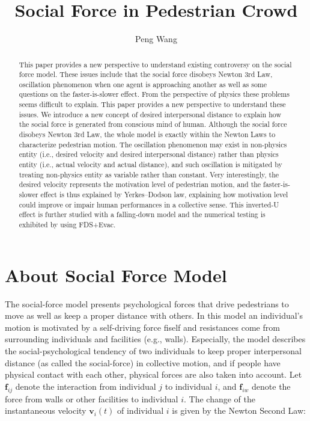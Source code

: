 \documentclass{article}
\begin{document}
\title{Social Force in Pedestrian Crowd}
\author{Peng Wang}%


\maketitle

\begin{abstract}
This paper provides a new perspective to understand existing controversy on the social force model.  These issues include that the social force disobeys Newton 3rd Law, oscillation phenomenon when one agent is approaching another as well as some questions on the faster-is-slower effect.  From the perspective of physics these problems seems difficult to explain.  This paper provides a new perspective to understand these issues.  We introduce a new concept of desired interpersonal distance to explain how the social force is generated from conscious mind of human.  Although the social force disobeys Newton 3rd Law, the whole model is exactly within the Newton Laws to characterize pedestrian motion.  The oscillation phenomenon may exist in non-physics entity (i.e., desired velocity and desired interpersonal distance) rather than physics entity (i.e., actual velocity and actual distance), and such oscillation is mitigated by treating non-physics entity as variable rather than constant.  Very interestingly, the desired velocity represents the motivation level of pedestrian motion, and the faster-is-slower effect is thus explained by Yerkes–Dodson law, explaining how motivation level could improve or impair human performances in a collective sense.  This inverted-U effect is further studied with a falling-down model and the numerical testing is exhibited by using FDS+Evac.
\end{abstract}


\section{About Social Force Model}

The social-force model presents psychological forces that drive pedestrians to move as well as keep a proper distance with others.  In this model an individual's motion is motivated by a self-driving force fiself and resistances come from surrounding individuals and facilities (e.g., walls).  Especially, the model describes the social-psychological tendency of two individuals to keep proper interpersonal distance (as called the social-force) in collective motion, and if people have physical contact with each other, physical forces are also taken into account.  Let $\mathbf{f}_{ij}$ denote the interaction from individual $j$ to individual $i$, and $\mathbf{f}_{iw}$ denote the force from walls or other facilities to individual $i$.  The change of the instantaneous velocity $\mathbf{v}_i(t)$ of individual $i$ is given by the Newton Second Law:
\end{document}
